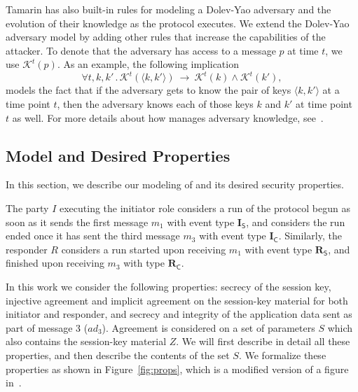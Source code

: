\documentclass[runningheads]{llncs}
\newcommand{\mFunStyle}[1]{\textsf{#1}}
\newcommand{\mProtocolStyle}[1]{\text{#1}}
\newcommand{\mIStart}{\ensuremath{\mathbf{I}_\mFunStyle{S}}}
\newcommand{\mIComplete}{\ensuremath{\mathbf{I}_\mFunStyle{C}}}
\newcommand{\mRStart}{\ensuremath{\mathbf{R}_\mFunStyle{S}}}
\newcommand{\mRComplete}{\ensuremath{\mathbf{R}_\mFunStyle{C}}}
\newcommand{\mK}{\ensuremath{\mathcal{K}}}
\DeclareMathOperator{\mLogicDot}{.}
\newcommand{\mTamarin}{\mProtocolStyle{Tamarin}}
\newcommand{\mEdhoc}{\mProtocolStyle{EDHOC}}
\newcommand{\mSessKey}{\ensuremath{Z}}
\newcommand{\mMsgone}{\ensuremath{m_1}}
\newcommand{\mMsgthree}{\ensuremath{m_3}}
\newcommand{\mAD}{\ensuremath{\mathit{ad}}}
\begin{document}
Tamarin has also built-in rules for modeling a Dolev-Yao adversary and the
evolution of their knowledge as the protocol executes.
%
We extend the Dolev-Yao adversary model by adding other rules that increase
the capabilities of the attacker.
%
To denote that the adversary has access to a message $p$ at time $t$, we use 
$\mK^{t}(p)$.
%
As an example, the following implication
\[
    \forall t, k, k'\mLogicDot \mK^{t}(\langle k, k'\rangle)\ \rightarrow\
\mK^{t}(k) \land \mK^{t}(k'),
\]
models the fact that if the adversary gets to know the pair of
keys $\langle k, k' \rangle$ at a time point $t$, then the adversary
knows each of those keys $k$ and $k'$ at time point $t$ as well.
%
For more details about how \mTamarin{} manages adversary knowledge,
see~\cite{DBLP:conf/cav/MeierSCB13}.
%

\subsection{Model and Desired Properties}
\label{sec:desired-properties}
In this section, we describe our modeling of \mEdhoc{} and its desired
security properties.
%

The party $I$ executing the initiator role considers a run of the protocol
begun as soon as it sends the first message \mMsgone{} with event type
\mIStart, and considers the run ended once it has sent the third message
\mMsgthree{} with event type \mIComplete.
%
Similarly, the responder $R$ considers a run started upon receiving 
\mMsgone{}
with event type \mRStart, and finished upon receiving \mMsgthree{} with 
type
\mRComplete.
%

In this work we consider the following properties: secrecy of the session key,
injective agreement and implicit agreement on the session-key material for 
both
initiator and responder, and secrecy and integrity of the application data sent
as part of message 3 ($\mAD_3$).
%
Agreement is considered on a set of parameters $S$ which also contains the
session-key material \mSessKey{}.
%
We will first describe in detail all these properties, and then describe the
contents of the set $S$.
%
We formalize these properties as shown in Figure~\ref{fig:props}, which is
a modified version of a figure in~\cite{Norr21}.
%
\end{document}
